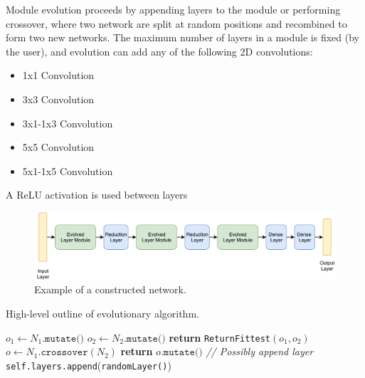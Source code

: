 \documentclass[conference]{IEEEtran}
\begin{document}
Module evolution proceeds by appending layers to the module or performing
crossover, where two network are split at random positions and recombined
to form two new networks. The maximum number of layers in a module is fixed
(by the user), and evolution can add any of the following 2D convolutions:
\begin{itemize}
\item 1x1 Convolution
\item 3x3 Convolution
\item 3x1-1x3 Convolution
\item 5x5 Convolution
\item 5x1-1x5 Convolution
\end{itemize}
A ReLU activation is used between layers

\begin{figure}
  \includegraphics{img/sample_arch}
  \caption{Example of a constructed network.}
  \label{fig:sample-arch}
\end{figure}


\begin{algorithm}
  \caption{High-level outline of evolutionary algorithm.}\label{alg:evo-simple}
  \begin{algorithmic}[1]
    \State $o_1\gets N_1.\texttt{mutate()}$
    \State $o_2 \gets N_2.\texttt{mutate()}$
    \State \textbf{return } \texttt{ReturnFittest}$(o_1, o_2)$
    \EndIf
    \State $o \gets N_1.\texttt{crossover}(N_2)$
    \State \textbf{return } $o.\texttt{mutate()}$
  \EndProcedure
  \State \emph{// Possibly append layer}
  \State \texttt{self.layers.append}(\texttt{randomLayer()})
  \EndIf
  \EndProcedure
  \end{algorithmic}
\end{algorithm}
\end{document}
